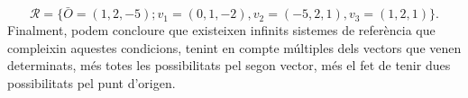\documentclass[11pt]{article}
\begin{document}
\begin{equation}
\mathcal{R}=\{\bar{O}=(1,2,-5);v_1=(0,1,-2),v_2=(-5,2,1),v_3=(1,2,1)\}.
\end{equation}
Finalment, podem concloure que existeixen infinits sistemes de referència que compleixin aquestes condicions, tenint en compte múltiples dels vectors que venen determinats, més totes les possibilitats pel segon vector, més el fet de tenir dues possibilitats pel punt d'origen.
\end{document}
